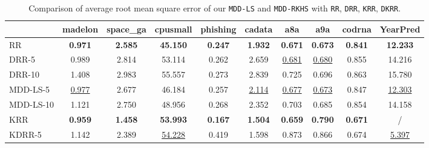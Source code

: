 \documentclass{article}
\begin{document}
\begin{table*}[t]
\small
\footnotesize
   \caption{
    \small Comparison of average root mean square error of our \texttt{MDD-LS} and \texttt{MDD-RKHS} with
    \texttt{RR}, \texttt{DRR}, \texttt{KRR}, \texttt{DKRR}.
   }
   \label{tabel:mse}
    \begin{tabular*}{\linewidth}{@{\extracolsep{-0.10cm}}lccccccccc}
    \toprule
                                &madelon                  &space\_ga               &cpusmall            &phishing           &cadata             &a8a                  &a9a                    &cod\-rna                   &YearPred                 \\   \hline
RR                              &\textbf{0.971}           &\textbf{2.585}          &\textbf{45.150}     &\textbf{0.247}     &\textbf{1.932}     &\textbf{0.671}       &\textbf{0.673}         &\textbf{0.841}             &\textbf{12.233} \\
DRR-5                           &0.989                    &2.814                   &53.114              &0.262              &2.659              &\underline{0.681}    &\underline{0.680}      &0.855                      &14.216 \\
DRR-10                          &1.408                    &2.983                   &55.557              &0.273              &2.839              &0.725                &0.696                  &0.863                      &15.780 \\
MDD-LS-5                        &\underline{0.977}        &2.677                   &46.184              &0.257              &\underline{2.114}  &\underline{0.677}    &\underline{0.673}      &0.847                      &\underline{12.303}\\
MDD-LS-10                       &1.121                    &2.750                   &48.956              &0.268              &2.352              &0.703                &0.685                  &0.854                      &14.158\\
\hline \hline
KRR                             &\textbf{0.959}           &\textbf{1.458}          &\textbf{53.993}     &\textbf{0.167}     &\textbf{1.504}     &\textbf{0.659}       &\textbf{0.790}         &\textbf{0.671}             &/ \\
KDRR-5                          &1.142                    &2.389                   &\underline{54.228}  &0.419              &1.598              &0.873                &0.866                  &0.674                      &\underline{5.397}\\

\end{tabular*}
\end{table*}
\end{document}
